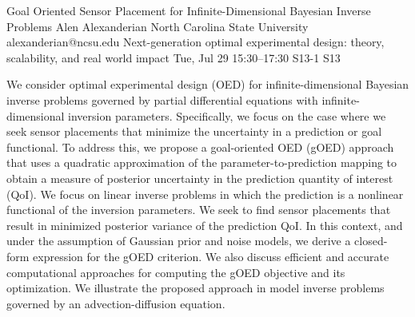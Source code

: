 \begin{talk}
  {Goal Oriented Sensor Placement for Infinite-Dimensional Bayesian Inverse Problems}%
  {Alen Alexanderian}%
  {North Carolina State University}%
  {alexanderian@ncsu.edu}%
  {Next-generation optimal experimental design: theory, scalability, and real world impact}%
  {}%
  {Tue, Jul 29 15:30–17:30}%
  {S13-1}%
  {S13}%
				
			
We consider optimal experimental design (OED) for infinite-dimensional Bayesian
inverse problems governed by partial differential equations with
infinite-dimensional inversion parameters.  Specifically, we focus on the case
where we seek sensor placements that minimize the uncertainty in a prediction or
goal functional.  To address this, we propose a goal-oriented OED (gOED)
approach that uses a quadratic approximation of the parameter-to-prediction
mapping to obtain a measure of posterior uncertainty in the prediction quantity
of interest (QoI).  We focus on linear inverse problems in which the prediction
is a nonlinear functional of the inversion parameters. We seek to find sensor
placements that result in minimized posterior variance of the prediction QoI. In
this context, and under the assumption of Gaussian prior and noise models, we
derive a closed-form expression for the gOED criterion. We also discuss
efficient and accurate computational approaches for computing the gOED objective
and its optimization.  We illustrate the proposed approach in model inverse
problems governed by an advection-diffusion equation.

\medskip

\end{talk}

